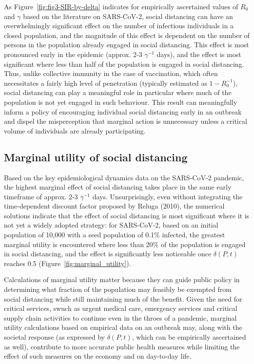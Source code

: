 \documentclass[12pt]{article}
\begin{document}
As Figure~\ref{fig:fig3-SIR-by-delta} indicates for empirically ascertained values of $R_0$ and $\gamma$ based on the literature on SARS-CoV-2,\cite{Li:2020aa,liu2020reproductive} social distancing can have an overwhelmingly significant effect on the number of infectious individuals in a closed population, and the magnitude of this effect is dependent on the number of persons in the population already engaged in social distancing. This effect is most pronounced early in the epidemic (approx. 2-3 $\gamma^{-1}$ days), and the effect is most significant where less than half of the population is engaged in social distancing. Thus, unlike collective immunity in the case of vaccination, which often necessitates a fairly high level of penetration (typically estimated as $1 - R_0^{-1}$), social distancing can play a meaningful role in particular where much of the population is not yet engaged in such behaviour. This result can meaningfully inform a policy of encouraging individual social distancing early in an outbreak and dispel the misperception that marginal action is unnecessary unless a critical volume of individuals are already participating.


\subsection{Marginal utility of social distancing} %
\label{sub:marginal_utility_of_social_distancing}

Based on the key epidemiological dynamics data on the SARS-CoV-2 pandemic,\cite{Li:2020aa,liu2020reproductive} the highest marginal effect of social distancing takes place in the same early timeframe of approx. 2-3 $\gamma^{-1}$ days. Unsurprisingly, even without integrating the time-dependent discount factor proposed by Reluga (2010),\cite{reluga2010game} the numerical solutions indicate that the effect of social distancing is most significant where it is not yet a widely adopted strategy: for SARS-CoV-2, based on an initial population of 10,000 with a seed population of 0.1\% infected, the greatest marginal utility is encountered where less than 20\% of the population is engaged in social distancing, and the effect is significantly less noticeable once $\delta(P, t)$ reaches 0.5 (Figure~\ref{fig:marginal_utility}).

Calculations of marginal utility matter because they can guide public policy in determining what fraction of the population may feasibly be exempted from social distancing while still maintaining much of the benefit. Given the need for critical services, swuch as urgent medical care, emergency services and critical supply chain activities to continue even in the throes of a pandemic, marginal utility calculations based on empirical data on an outbreak may, along with the societal response (as expressed by $\delta(P, t)$, which can be empirically ascertained as well), contribute to more accurate public health measures while limiting the effect of such measures on the economy and on day-to-day life. 
\end{document}
